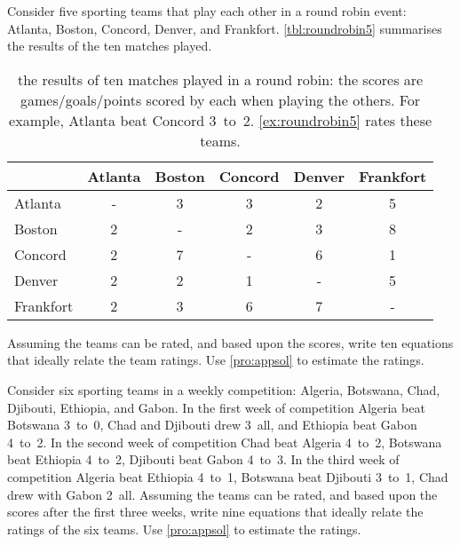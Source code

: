 \begin{exercise} \label{ex:roundrobin5} 
Consider five sporting teams that play each other in a round robin  event: Atlanta, Boston, Concord, Denver, and Frankfort.
\autoref{tbl:roundrobin5} summarises the results of the ten matches played.
\begin{table}
\caption{the results of ten matches played in a round robin: the scores are games\slash goals\slash points scored by each when playing the others.  For example, Atlanta beat Concord 3~to~2.  \autoref{ex:roundrobin5} rates these teams.}
\label{tbl:roundrobin5}
\begin{center}
\begin{tabular}{@{}l|ccccc@{}} \hline
&Atlanta& Boston& Concord& Denver&Frankfort\\ \hline
Atlanta & - & 3 & 3 & 2 & 5 \\
Boston & 2 & - & 2 & 3 & 8 \\
Concord & 2 & 7 & - & 6 & 1 \\
Denver & 2 & 2 & 1 & - & 5 \\ 
Frankfort& 2 & 3 & 6 & 7 & - \\\hline
\end{tabular}
\end{center}
\end{table}%
Assuming the teams can be rated, and  based upon the scores, write ten equations that ideally relate the team ratings.  
Use \autoref{pro:appsol} to estimate the ratings.
\end{exercise}




\begin{exercise} \label{ex:roundrobin6} 
Consider six sporting teams in a weekly competition: Algeria, Botswana, Chad, Djibouti, Ethiopia, and Gabon.
In the first week of competition 
Algeria beat Botswana 3~to~0, 
Chad and Djibouti drew 3~all, and 
Ethiopia beat Gabon 4~to~2.
In the second week of competition 
Chad beat Algeria 4~to~2, 
Botswana beat Ethiopia 4~to~2,
Djibouti beat Gabon 4~to~3.
In the third week of competition 
Algeria beat Ethiopia 4~to~1, 
Botswana beat Djibouti 3~to~1,
Chad drew with Gabon 2~all.
Assuming the teams can be rated, and  based upon the scores after the first three weeks, write nine equations that ideally relate the ratings of the six teams.  
Use \autoref{pro:appsol} to estimate the ratings.
\end{exercise}



